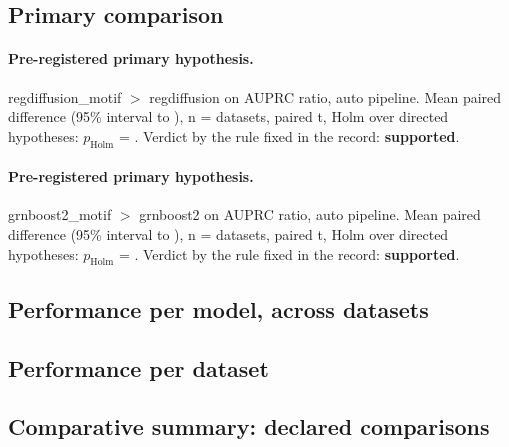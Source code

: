 \documentclass{article}
\begin{document}
\subsection{Primary comparison}
\paragraph{Pre-registered primary hypothesis.} regdiffusion\_motif $>$ regdiffusion on AUPRC ratio, auto pipeline. Mean paired difference \gbDiffAuprcRatioAutoRegdiffusionMotifVsRegdiffusion{} (95\% interval \gbCiLowAuprcRatioAutoRegdiffusionMotifVsRegdiffusion{} to \gbCiHighAuprcRatioAutoRegdiffusionMotifVsRegdiffusion{}), n = \gbNAuprcRatioAutoRegdiffusionMotifVsRegdiffusion{} datasets, paired t, Holm over \gbFamilyAuprcRatioAuto{} directed hypotheses: $p_{\mathrm{Holm}}$ = \gbPHolmAuprcRatioAutoRegdiffusionMotifVsRegdiffusion{}. Verdict by the rule fixed in the record: \textbf{supported}.
\paragraph{Pre-registered primary hypothesis.} grnboost2\_motif $>$ grnboost2 on AUPRC ratio, auto pipeline. Mean paired difference \gbDiffAuprcRatioAutoGrnboostTwoMotifVsGrnboostTwo{} (95\% interval \gbCiLowAuprcRatioAutoGrnboostTwoMotifVsGrnboostTwo{} to \gbCiHighAuprcRatioAutoGrnboostTwoMotifVsGrnboostTwo{}), n = \gbNAuprcRatioAutoGrnboostTwoMotifVsGrnboostTwo{} datasets, paired t, Holm over \gbFamilyAuprcRatioAuto{} directed hypotheses: $p_{\mathrm{Holm}}$ = \gbPHolmAuprcRatioAutoGrnboostTwoMotifVsGrnboostTwo{}. Verdict by the rule fixed in the record: \textbf{supported}.

\subsection{Performance per model, across datasets}

\subsection{Performance per dataset}

\subsection{Comparative summary: declared comparisons}




\end{document}
